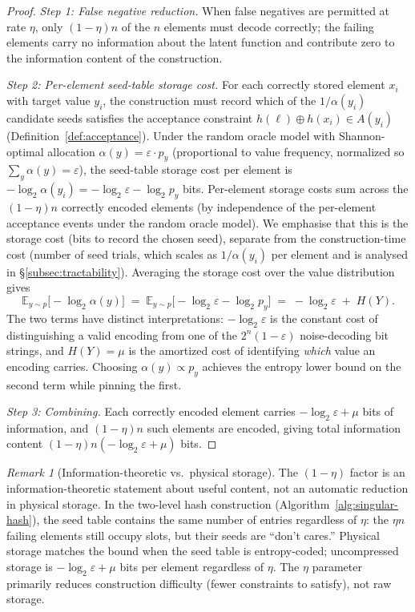 \documentclass[11pt]{article}
\theoremstyle{definition}
\theoremstyle{plain}
\theoremstyle{remark}
\newtheorem{remark}{Remark}[section]
\begin{document}
\begin{proof}
\emph{Step 1: False negative reduction.}
When false negatives are permitted at rate $\eta$, only $(1-\eta)n$ of the
$n$ elements must decode correctly; the failing elements carry no
information about the latent function and contribute zero to the
information content of the construction.

\emph{Step 2: Per-element seed-table storage cost.}
For each correctly stored element $x_i$ with target value $y_i$, the
construction must record which of the $1/\alpha(y_i)$ candidate seeds
satisfies the acceptance constraint $h(\ell) \oplus h(x_i) \in A(y_i)$
(Definition~\ref{def:acceptance}).  Under the random oracle model with
Shannon-optimal allocation $\alpha(y) = \varepsilon \cdot p_y$
(proportional to value frequency, normalized so $\sum_y \alpha(y) =
\varepsilon$), the seed-table storage cost per element is
$-\log_2 \alpha(y_i) = -\log_2 \varepsilon - \log_2 p_y$ bits.  Per-element
storage costs sum across the $(1-\eta)n$ correctly encoded elements (by
independence of the per-element acceptance events under the random
oracle model).  We emphasise that this is the storage cost (bits to
record the chosen seed), separate from the construction-time cost
(number of seed trials, which scales as $1/\alpha(y_i)$ per element and
is analysed in \S\ref{subsec:tractability}).  Averaging the storage cost
over the value distribution gives
\[
\mathbb{E}_{y \sim p}\bigl[-\log_2 \alpha(y)\bigr]
\;=\; \mathbb{E}_{y \sim p}\bigl[-\log_2 \varepsilon - \log_2 p_y\bigr]
\;=\; -\log_2 \varepsilon \;+\; H(Y).
\]
The two terms have distinct interpretations: $-\log_2 \varepsilon$ is
the constant cost of distinguishing a valid encoding from one of the
$2^n(1-\varepsilon)$ noise-decoding bit strings, and $H(Y) = \mu$ is the
amortized cost of identifying \emph{which} value an encoding carries.
Choosing $\alpha(y) \propto p_y$ achieves the entropy lower bound on the
second term while pinning the first.

\emph{Step 3: Combining.}
Each correctly encoded element carries $-\log_2 \varepsilon + \mu$ bits of
information, and $(1-\eta)n$ such elements are encoded, giving total
information content $(1-\eta)n(-\log_2 \varepsilon + \mu)$ bits.
\end{proof}

\begin{remark}[Information-theoretic vs.\ physical storage]
\label{rem:physical-storage}
The $(1-\eta)$ factor is an information-theoretic statement about useful
content, not an automatic reduction in physical storage.  In the two-level
hash construction (Algorithm~\ref{alg:singular-hash}), the seed table
contains the same number of entries regardless of $\eta$: the $\eta n$
failing elements still occupy slots, but their seeds are ``don't cares.''
Physical storage matches the bound when the seed table is entropy-coded;
uncompressed storage is $-\log_2 \varepsilon + \mu$ bits per element
regardless of $\eta$.  The $\eta$ parameter primarily reduces construction
difficulty (fewer constraints to satisfy), not raw storage.
\end{remark}
\end{document}

